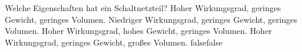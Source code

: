     {Welche Eigenschaften hat ein Schaltnetzteil?}
    {Hoher Wirkungsgrad, geringes Gewicht, geringes Volumen.}
    {Niedriger Wirkungsgrad, geringes Gewicht, geringes Volumen.}
    {Hoher Wirkungsgrad, hohes Gewicht, geringes Volumen.}
    {Hoher Wirkungsgrad, geringes Gewicht, großes Volumen.}
    {false}{false}